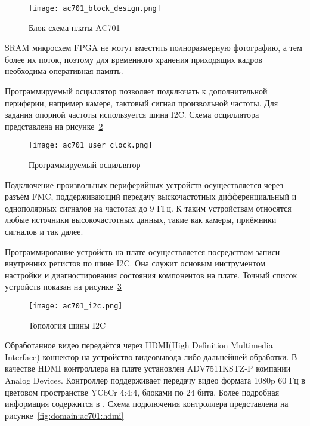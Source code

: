 \begin{figure}[ht]
  \centering
  \texttt{[image: ac701\_block\_design.png]}
  \caption{ Блок схема платы AC701 }
  \label{fig:domain:ac701:block_design}
\end{figure}

SRAM микросхем FPGA не могут вместить полноразмерную фотографию, а тем более их поток, поэтому
для временного хранения приходящих кадров необходима оперативная память. %

Программируемый осциллятор позволяет подключать к дополнительной периферии, например камере, тактовый сигнал произвольной частоты.
Для задания опорной частоты используется шина I2C. Схема осциллятора представлена на рисунке~\ref{fig:domain:ac701:user_clock}
\begin{figure}[ht]
  \centering
  \texttt{[image: ac701\_user\_clock.png]}
  \caption{ Программируемый осциллятор }
  \label{fig:domain:ac701:user_clock}
\end{figure}

Подключение произвольных периферийных устройств осуществляется через разъём FMC, поддерживающий передачу
выскочастотных дифференциальный и однополярных сигналов на частотах до 9 ГГц\cite[c. 57]{ac701_user_guide}.
К таким устройствам относятся любые источники высокочастотных данных, такие как камеры, приёмники сигналов и так далее.

Программирование устройств на плате осуществляется посредством записи внутренних регистов по шине I2C. Она служит основым
инструментом настройки и диагностирования состояния компонентов на плате. Точный список устройств показан на
рисунке~\ref{fig:domain:ac701:i2c}

\begin{figure}[ht]
  \centering
  \texttt{[image: ac701\_i2c.png]}
  \caption{ Топология шины I2C }
  \label{fig:domain:ac701:i2c}
\end{figure}

Обработанное видео передаётся через HDMI(High Definition Multimedia Interface) коннектор на устройство видеовывода либо дальнейшей обработки. В качестве
HDMI контроллера на плате установлен ADV7511KSTZ-P компании Analog Devices. Контроллер поддерживает передачу видео формата 1080p 60 Гц в
цветовом пространстве YCbCr 4:4:4, блоками по 24 бита. Более подробная информация содержится в \cite{adv7511_datasheet}.
Схема подключения контроллера представлена на рисунке~\ref{fig:domain:ac701:hdmi}

